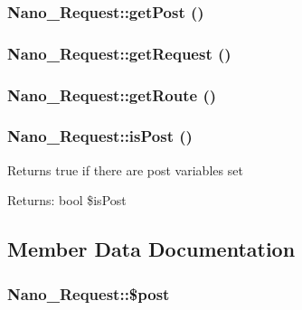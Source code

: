 \hypertarget{classNano__Request_3854dcacacdebd060d36cf6cfa89d2bb}{
\subsubsection[{getPost}]{\setlength{\rightskip}{0pt plus 5cm}Nano\_\-Request::getPost ()}}
\label{classNano__Request_3854dcacacdebd060d36cf6cfa89d2bb}


\hypertarget{classNano__Request_87b53048868a2e87399db72f5eafa197}{
\subsubsection[{getRequest}]{\setlength{\rightskip}{0pt plus 5cm}Nano\_\-Request::getRequest ()}}
\label{classNano__Request_87b53048868a2e87399db72f5eafa197}


\hypertarget{classNano__Request_476422c0a66d70b8cb362ca6dece85c0}{
\subsubsection[{getRoute}]{\setlength{\rightskip}{0pt plus 5cm}Nano\_\-Request::getRoute ()}}
\label{classNano__Request_476422c0a66d70b8cb362ca6dece85c0}


\hypertarget{classNano__Request_f90aea04a9a598f220072ce05cc8f050}{
\subsubsection[{isPost}]{\setlength{\rightskip}{0pt plus 5cm}Nano\_\-Request::isPost ()}}
\label{classNano__Request_f90aea04a9a598f220072ce05cc8f050}


Returns true if there are post variables set

\begin{Desc}
\item[Returns:]bool \$isPost \end{Desc}


\subsection{Member Data Documentation}
\hypertarget{classNano__Request_3d3cfcf3a580a5160e1b4c3cb589c811}{
\subsubsection[{\$post}]{\setlength{\rightskip}{0pt plus 5cm}Nano\_\-Request::\$post}}
\label{classNano__Request_3d3cfcf3a580a5160e1b4c3cb589c811}


